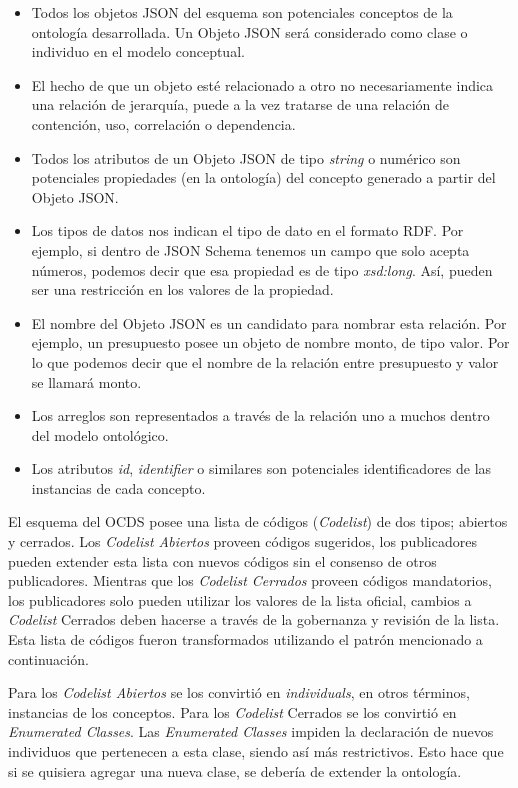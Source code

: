 \begin{itemize}
    \item Todos los objetos JSON del esquema son potenciales conceptos de la ontología desarrollada. Un Objeto JSON será considerado como clase o individuo en el modelo conceptual.
    \item El hecho de que un objeto esté relacionado a otro no necesariamente indica una relación de jerarquía, puede a la vez tratarse de una relación de contención, uso, correlación o dependencia.
    \item Todos los atributos de un Objeto JSON de tipo \textit{string} o numérico son potenciales propiedades (en la ontología) del concepto generado a partir del Objeto JSON.
    \item Los tipos de datos nos indican el tipo de dato en el formato RDF. Por ejemplo, si dentro de JSON Schema tenemos un campo que solo acepta números, podemos decir que esa propiedad es de tipo \textit{xsd:long}. Así, pueden ser una restricción en los valores de la propiedad.
    \item El nombre del Objeto JSON es un candidato para nombrar esta relación. Por ejemplo, un presupuesto posee un objeto de nombre monto, de tipo valor. Por lo que podemos decir que el nombre de la relación entre presupuesto y valor se llamará monto.
    \item Los arreglos son representados a través de la relación uno a muchos dentro del modelo ontológico.
    \item Los atributos \textit{id}, \textit{identifier} o similares son potenciales identificadores de las instancias de cada concepto.
    
\end{itemize}

El esquema del OCDS posee una lista de códigos (\textit{Codelist}) de dos tipos; abiertos y cerrados. Los \textit{Codelist Abiertos} proveen códigos sugeridos, los publicadores pueden extender esta lista con nuevos códigos sin el consenso de otros publicadores. Mientras que los \textit{Codelist Cerrados} proveen códigos mandatorios, los publicadores solo pueden utilizar los valores de la lista oficial, cambios a \textit{Codelist} Cerrados deben hacerse a través de la gobernanza y revisión de la lista. Esta lista de códigos fueron transformados utilizando el patrón mencionado a continuación. 

Para los \textit{Codelist Abiertos} se los convirtió en \textit{individuals}, en otros términos, instancias de los conceptos. Para los \textit{Codelist} Cerrados se los convirtió en \textit{Enumerated Classes}. Las \textit{Enumerated Classes} impiden la declaración de nuevos individuos que pertenecen a esta clase, siendo así más restrictivos. Esto hace que si se quisiera agregar una nueva clase, se debería de extender la ontología.
